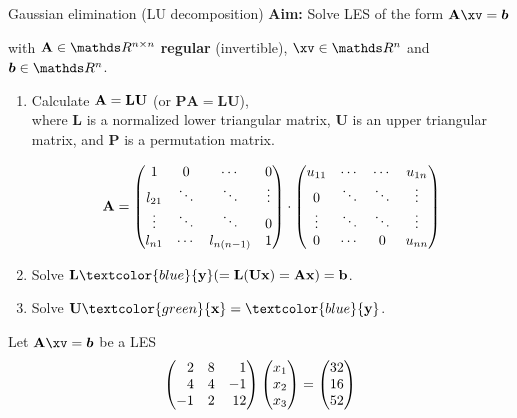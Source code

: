 



\begin{vbframe}{Gaussian elimination (LU decomposition)}
\textbf{Aim:} Solve LES of the form $\Amat \xv = \boldsymbol{b}$\\
\medskip

with $\Amat \in \R^{n \times n}$ \textbf{regular} (invertible), $\xv \in \R^n$ and $\boldsymbol{b} \in \R^n$.

\begin{enumerate}
\item Calculate $\mathbf{A} = \mathbf{LU}$ (or $\mathbf{PA} = \mathbf{LU}$), \\
  where $\mathbf{L}$ is a normalized lower triangular matrix, $\mathbf{U}$ is an upper triangular matrix, and $\mathbf{P}$ is a permutation matrix.

\begin{footnotesize}
$$
\mathbf{A} = \begin{pmatrix} 
1       & 0     & \cdots  & 0 \\
l_{21}  & \ddots& \ddots  & \vdots \\
\vdots  & \ddots& \ddots  & 0 \\
l_{n1}  & \cdots& l_{n(n-1)}  & 1  \end{pmatrix} \cdot
\begin{pmatrix} 
u_{11}  & \cdots  & \cdots & u_{1n} \\
0       & \ddots  & \ddots & \vdots \\
\vdots  & \ddots  & \ddots  & \vdots \\
0       & \cdots  & 0       & u_{nn}  \end{pmatrix}$$
\end{footnotesize}

\item Solve  $\mathbf{L}\textcolor{blue}{\textbf{y}} ( = \mathbf{L(Ux)} = \mathbf{Ax}) = \mathbf{b}$.
\item Solve  $\mathbf{U}\textcolor{green}{\textbf{x}} = \textcolor{blue}{\textbf{y}}$.
\end{enumerate}



\framebreak

Let $\Amat \xv = \boldsymbol{b}$ be a LES
$$
\begin{pmatrix*}[r]
2 & 8 & 1 \\
4 & 4 & -1 \\
-1 & 2 & 12\end{pmatrix*}
\mat{
x_1 \\ x_2 \\ x_3
\end{pmatrix} = \begin{pmatrix}
32 \\ 16 \\ 52 }
$$


\end{vbframe}
